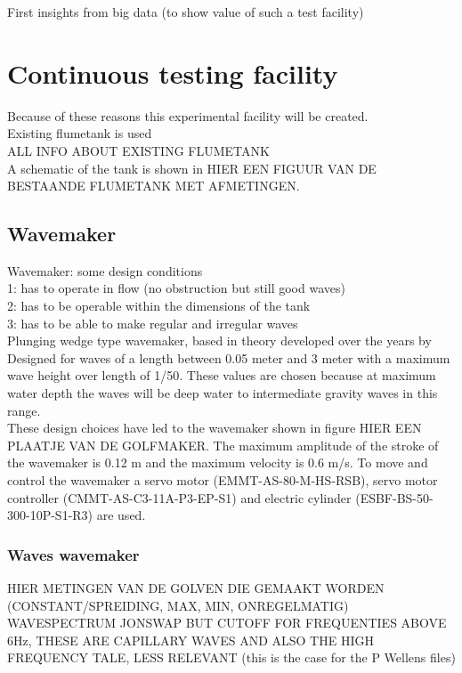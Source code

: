 First insights from big data (to show value of such a test facility)\\


\chapter{Continuous testing facility}
\label{sec:exp_setup}
Because of these reasons this experimental facility will be created. \\
Existing flumetank is used \\
ALL INFO ABOUT EXISTING FLUMETANK \\
A schematic of the tank is shown in HIER EEN FIGUUR VAN DE BESTAANDE FLUMETANK MET AFMETINGEN. 


\section{Wavemaker}
\label{sec:wavemaker}
Wavemaker: some design conditions \\
1: has to operate in flow (no obstruction but still good waves) \\
2: has to be operable within the dimensions of the tank \\
3: has to be able to make regular and irregular waves \\
Plunging wedge type wavemaker, based in theory developed over the years by \citet{Madsen1970,Wu1988,Lowell2020} \\
Designed for waves of a length between 0.05 meter and 3 meter with a maximum wave height over length of 1/50. These values are chosen because at maximum water depth the waves will be deep water to intermediate gravity waves in this range. \\
These design choices have led to the wavemaker shown in figure HIER EEN PLAATJE VAN DE GOLFMAKER. The maximum amplitude of the stroke of the wavemaker is 0.12 m and the maximum velocity is 0.6 m/s. To move and control the wavemaker a servo motor (EMMT-AS-80-M-HS-RSB), servo motor controller (CMMT-AS-C3-11A-P3-EP-S1) and electric cylinder (ESBF-BS-50-300-10P-S1-R3)  are used. 

\subsection{Waves wavemaker}
\label{sec:results_wavemaker}
HIER METINGEN VAN DE GOLVEN DIE GEMAAKT WORDEN (CONSTANT/SPREIDING, MAX, MIN, ONREGELMATIG)\\
WAVESPECTRUM JONSWAP BUT CUTOFF FOR FREQUENTIES ABOVE 6Hz, THESE ARE CAPILLARY WAVES AND ALSO THE HIGH FREQUENCY TALE, LESS RELEVANT (this is the case for the P Wellens files)

